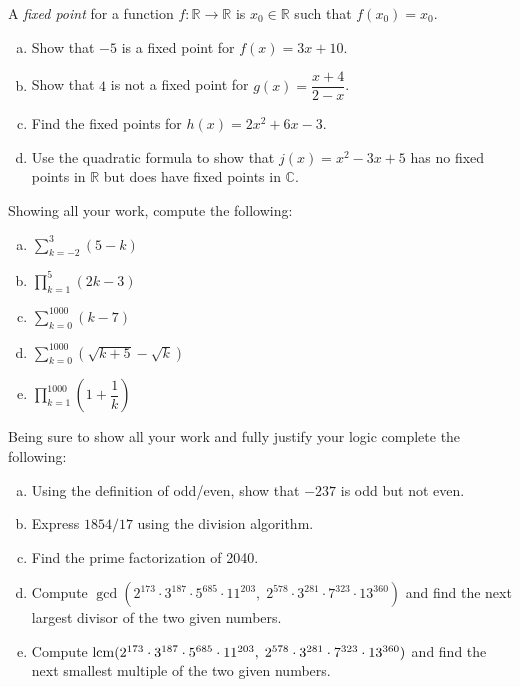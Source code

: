 \documentclass[12pt,letterpaper]{exam}
\begin{document}
\begin{questions}
\newpage
\question[10] A \textit{fixed point} for a function $f: \mathbb{R} \to \mathbb{R}$ is $x_0 \in \mathbb{R}$ such that $f(x_0)= x_0$. 
	\begin{enumerate}[(a)]
	\item Show that $-5$ is a fixed point for $f(x)= 3x + 10$.
	\item Show that $4$ is not a fixed point for $g(x)= \dfrac{x + 4}{2 - x}$.
	\item Find the fixed points for $h(x)= 2x^2 + 6x - 3$. 
	\item Use the quadratic formula to show that $j(x)= x^2 - 3x + 5$ has no fixed points in $\mathbb{R}$ but does have fixed points in $\mathbb{C}$. 
	\end{enumerate}



\newpage
\question[10] Showing all your work, compute the following:
	\begin{enumerate}[(a)]
	\item $\displaystyle \sum_{k= -2}^3 (5 - k)$
	\item $\displaystyle \prod_{k=1}^5 (2k - 3)$ 
	\item $\displaystyle \sum_{k=0}^{1000} (k - 7)$
	\item $\displaystyle \sum_{k=0}^{1000} \left( \sqrt{k + 5} - \sqrt{k} \right)$
	\item $\displaystyle \prod_{k=1}^{1000} \left(1 + \dfrac{1}{k} \right)$
	\end{enumerate}



\newpage
\question[10] Being sure to show all your work and fully justify your logic complete the following:
	\begin{enumerate}[(a)]
	\item Using the definition of odd/even, show that $-237$ is odd but not even.
	\item Express $1854/17$ using the division algorithm. 
	\item Find the prime factorization of 2040. 
	\item Compute $\gcd(2^{173} \cdot 3^{187} \cdot 5^{685} \cdot 11^{203}, \; 2^{578} \cdot 3^{281} \cdot 7^{323} \cdot 13^{360})$ and find the next largest divisor of the two given numbers. 
	\item Compute $\operatorname{lcm}(2^{173} \cdot 3^{187} \cdot 5^{685} \cdot 11^{203}, \; 2^{578} \cdot 3^{281} \cdot 7^{323} \cdot 13^{360})$ and find the next smallest multiple of the two given numbers.
	\end{enumerate}




\end{questions}
\end{document}

